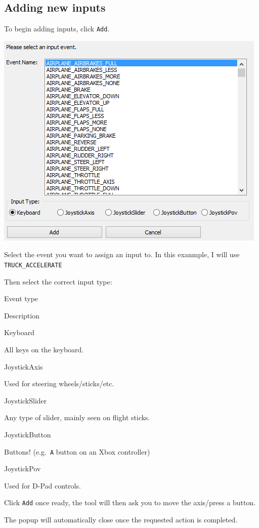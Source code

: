 \hypertarget{adding-new-inputs}{%
\subsection{Adding new inputs}\label{adding-new-inputs}}

To begin adding inputs, click \texttt{Add}.

\includegraphics{images/InputMappingTool-2.png}

Select the event you want to assign an input to. In this exanmple, I
will use \texttt{TRUCK\_ACCELERATE}

Then select the correct input type:

Event type

Description

Keyboard

All keys on the keyboard.

JoystickAxis

Used for steering wheels/sticks/etc.

JoystickSlider

Any type of slider, mainly seen on flight sticks.

JoystickButton

Buttons! (e.g.~\texttt{A} button on an Xbox controller)

JoystickPov

Used for D-Pad controls.

Click \texttt{Add} once ready, the tool will then ask you to move the
axis/press a button.

The popup will automatically close once the requested action is
completed.


